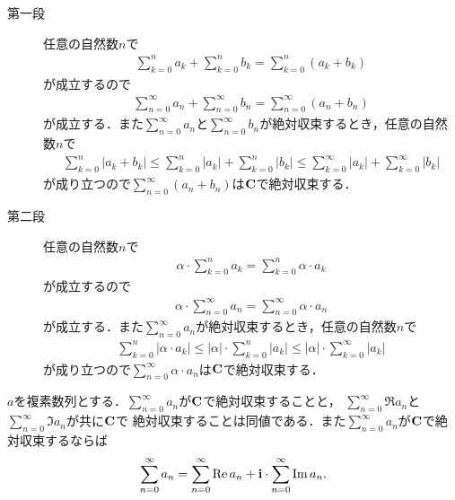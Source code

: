 	\begin{sketch}\mbox{}
		\begin{description}
			\item[第一段] 任意の自然数$n$で
				\begin{align}
					\sum_{k=0}^n a_k + \sum_{k=0}^n b_k = \sum_{k=0}^n (a_k + b_k)
				\end{align}
				が成立するので
				\begin{align}
					\sum_{n=0}^\infty a_n + \sum_{n=0}^\infty b_n = \sum_{n=0}^\infty (a_n + b_n)
				\end{align}
				が成立する．また$\sum_{n=0}^\infty a_n$と$\sum_{n=0}^\infty b_n$が絶対収束するとき，任意の自然数$n$で
				\begin{align}
					\sum_{k=0}^n |a_k + b_k| \leq \sum_{k=0}^n |a_k| + \sum_{k=0}^n |b_k| 
					\leq \sum_{k=0}^\infty |a_k| + \sum_{k=0}^\infty |b_k|
				\end{align}
				が成り立つので$\sum_{n=0}^\infty (a_n + b_n)$は$\mathbf{C}$で絶対収束する．
			
			\item[第二段] 任意の自然数$n$で
				\begin{align}
					\alpha \cdot \sum_{k=0}^n a_k = \sum_{k=0}^n \alpha \cdot a_k
				\end{align}
				が成立するので
				\begin{align}
					\alpha \cdot \sum_{n=0}^\infty a_n = \sum_{n=0}^\infty \alpha \cdot a_n
				\end{align}
				が成立する．また$\sum_{n=0}^\infty a_n$が絶対収束するとき，任意の自然数$n$で
				\begin{align}
					\sum_{k=0}^n |\alpha \cdot a_k| \leq |\alpha| \cdot \sum_{k=0}^n |a_k| 
					\leq |\alpha| \cdot \sum_{k=0}^\infty |a_k| 
				\end{align}
				が成り立つので$\sum_{n=0}^\infty \alpha \cdot a_n$は$\mathbf{C}$で絶対収束する．
				\QED
		\end{description}
	\end{sketch}
	
	\begin{screen}
		\begin{thm}
		\label{thm:absolutely_convergent_series_is_sum_of_series_of_real_and_imaginary_part}
			$a$を複素数列とする．$\sum_{n=0}^\infty a_n$が$\mathbf{C}$で絶対収束することと，
			$\sum_{n=0}^\infty \Re{a_n}$と$\sum_{n=0}^\infty \Im{a_n}$が共に$\mathbf{C}$で
			絶対収束することは同値である．また$\sum_{n=0}^\infty a_n$が$\mathbf{C}$で絶対収束するならば
			\begin{align}
				\sum_{n=0}^\infty a_n = \sum_{n=0}^\infty \operatorname{Re} a_n + \mathbf{i} \cdot \sum_{n=0}^\infty \operatorname{Im} a_n.
			\end{align}
		\end{thm}
	\end{screen}
	
